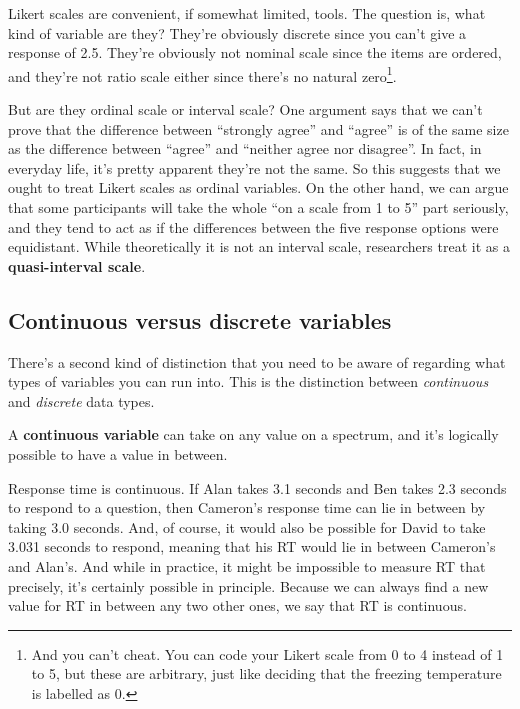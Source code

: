 \documentclass[
  11pt,
  a4paper,
  twoside,symmetric,openright]{book}
\theoremstyle{break}
\theoremstyle{break}
\begin{document}
Likert scales are convenient, if somewhat limited, tools. The question is, what kind of variable are they? They're obviously discrete since you can't give a response of 2.5. They're obviously not nominal scale since the items are ordered, and they're not ratio scale either since there's no natural zero\footnote{And you can't cheat. You can code your Likert scale from 0 to 4 instead of 1 to 5, but these are arbitrary, just like deciding that the freezing temperature is labelled as 0.}.

But are they ordinal scale or interval scale? One argument says that we can't prove that the difference between ``strongly agree'' and ``agree'' is of the same size as the difference between ``agree'' and ``neither agree nor disagree''. In fact, in everyday life, it's pretty apparent they're not the same. So this suggests that we ought to treat Likert scales as ordinal variables. On the other hand, we can argue that some participants will take the whole ``on a scale from 1 to 5'' part seriously, and they tend to act as if the differences between the five response options were equidistant. While theoretically it is not an interval scale, researchers treat it as a \textbf{quasi-interval scale}.

\hypertarget{continuousdiscrete}{%
\subsection{Continuous versus discrete variables}\label{continuousdiscrete}}

There's a second kind of distinction that you need to be aware of regarding what types of variables you can run into. This is the distinction between \emph{continuous} and \emph{discrete} data types.

\begin{definition}
\protect\hypertarget{def:defcontinuous}{}\label{def:defcontinuous}A \textbf{continuous variable} can take on any value on a spectrum, and it's logically possible to have a value in between.
\end{definition}

\begin{example}
\protect\hypertarget{exm:excontinuous}{}\label{exm:excontinuous}Response time is continuous. If Alan takes 3.1 seconds and Ben takes 2.3 seconds to respond to a question, then Cameron's response time can lie in between by taking 3.0 seconds. And, of course, it would also be possible for David to take 3.031 seconds to respond, meaning that his RT would lie in between Cameron's and Alan's. And while in practice, it might be impossible to measure RT that precisely, it's certainly possible in principle. Because we can always find a new value for RT in between any two other ones, we say that RT is continuous.
\end{example}
\end{document}
